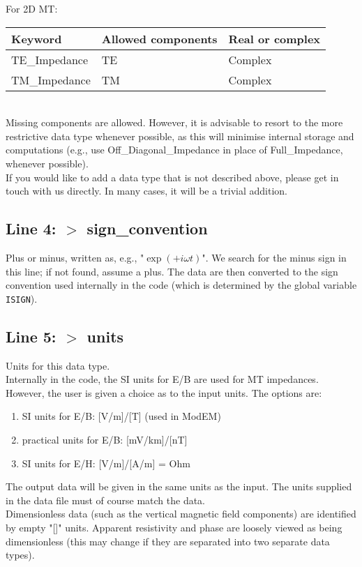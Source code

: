 \documentclass[12pt]{article}
\begin{document}
\noindent
For 2D MT:\\
\noindent
\begin{tabular}{|p{5cm}|p{7.5cm}|p{3.5cm}|}
  \hline
  Keyword & Allowed components & Real or complex \\
  \hline
  TE\_Impedance & TE & Complex \\
  TM\_Impedance & TM & Complex \\
  \hline
\end{tabular}\\

\noindent
Missing components are allowed. However, it is advisable to resort to the more restrictive data type whenever possible, as this will minimise internal storage and computations (e.g., use Off\_Diagonal\_Impedance in place of Full\_Impedance, whenever possible).\\

If you would like to add a data type that is not described above, please get in touch with us directly. In many cases, it will be a trivial addition.

\subsection*{Line 4: $>$ sign\_convention}
Plus or minus, written as, e.g., "$\exp(+i\omega t)$". We search for the minus sign in this line; if not found, assume a plus. The data are then converted to the sign convention used internally in the code (which is determined by the global variable \verb"ISIGN").

\subsection*{Line 5: $>$ units}
Units for this data type.\\
Internally in the code, the SI units for E/B are used for MT impedances. However, the user is given a choice as to the input units. The options are:
\begin{enumerate}
  \item SI units for E/B: [V/m]/[T] (used in ModEM)
  \item practical units for E/B: [mV/km]/[nT]
  \item SI units for E/H: [V/m]/[A/m] = Ohm
\end{enumerate}
The output data will be given in the same units as the input. The units supplied in the data file must of course match the data.\\
Dimensionless data (such as the vertical magnetic field components) are identified by empty "[]" units. Apparent resistivity and phase are loosely viewed as being dimensionless (this may change if they are separated into two separate data types).
\end{document}
